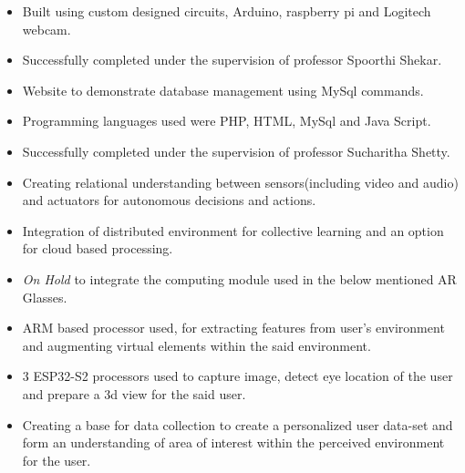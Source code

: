 


\begin{itemize}
\item Built using custom designed circuits, Arduino, raspberry pi and Logitech webcam.
\smallskip
\item Successfully completed under the supervision of professor Spoorthi Shekar.
\end{itemize}
\smallskip


\begin{itemize}
\item Website to demonstrate database management using MySql commands.
\smallskip
\item Programming languages used were PHP, HTML, MySql and Java Script.
\smallskip
\item Successfully completed under the supervision of professor Sucharitha Shetty.
\end{itemize}
\smallskip


\begin{itemize}
\item Creating relational understanding between sensors(including video and audio) and actuators for autonomous decisions and actions.

\item Integration of distributed environment for collective learning and an option for cloud based processing.
\smallskip
\item \textit{On Hold} to integrate the computing module used in the below mentioned AR Glasses.
\end{itemize}
\smallskip

\begin{itemize}
\item ARM based processor used, for extracting features from user's environment and augmenting virtual elements within the said environment.
\item 3 ESP32-S2 processors used to capture image, detect eye location of the user and prepare a 3d view for the said user.
\item Creating a base for data collection to create a personalized user data-set and form an understanding of area of interest within the perceived environment for the user. 
\end{itemize}

